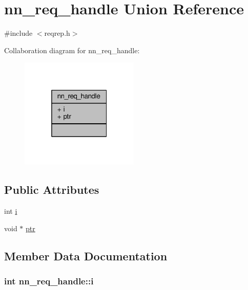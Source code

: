 \hypertarget{unionnn__req__handle}{}\section{nn\+\_\+req\+\_\+handle Union Reference}
\label{unionnn__req__handle}


{\ttfamily \#include $<$reqrep.\+h$>$}



Collaboration diagram for nn\+\_\+req\+\_\+handle\+:\nopagebreak
\begin{figure}[H]
\begin{center}
\leavevmode
\includegraphics[width=160pt]{unionnn__req__handle__coll__graph}
\end{center}
\end{figure}
\subsection*{Public Attributes}
\begin{DoxyCompactItemize}
\item 
int \hyperlink{unionnn__req__handle_ab7457feef868c8ef6b2253429145ef22}{i}
\item 
void $\ast$ \hyperlink{unionnn__req__handle_aa2688ebeaa0a23aa18c36927331a8d52}{ptr}
\end{DoxyCompactItemize}


\subsection{Member Data Documentation}
\subsubsection[{i}]{\setlength{\rightskip}{0pt plus 5cm}int nn\+\_\+req\+\_\+handle\+::i}\hypertarget{unionnn__req__handle_ab7457feef868c8ef6b2253429145ef22}{}\label{unionnn__req__handle_ab7457feef868c8ef6b2253429145ef22}
